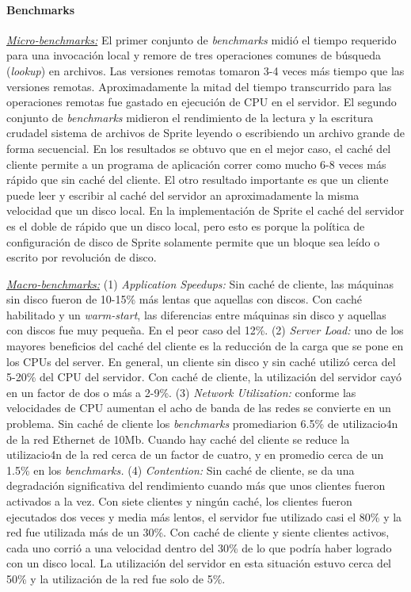 \paragraph{\textnormal{\textbf{Benchmarks}}}
\underline{\emph{Micro-benchmarks:}} El primer conjunto de \emph{benchmarks} midió el tiempo requerido para una invocación local y remore de tres operaciones comunes de búsqueda (\emph{lookup}) en archivos. Las versiones remotas tomaron 3-4 veces más tiempo que las versiones remotas. Aproximadamente la mitad del tiempo transcurrido para las operaciones remotas fue gastado en ejecución de CPU en el servidor. El segundo conjunto de \emph{benchmarks} midieron el rendimiento de la lectura y la escritura crudadel sistema de archivos de Sprite leyendo o escribiendo un archivo grande de forma secuencial. En los resultados se obtuvo que en el mejor caso, el caché del cliente permite a un programa de aplicación correr como mucho 6-8 veces más rápido que sin caché del cliente. El otro resultado importante es que un cliente puede leer y escribir al caché del servidor an aproximadamente la misma velocidad que un disco local. En la implementación de Sprite el caché del servidor es el doble de rápido que un disco local, pero esto es porque la política de configuración de disco de Sprite solamente permite que un bloque sea leído o escrito por revolución de disco. 

\underline{\emph{Macro-benchmarks:}} (1) \emph{Application Speedups:} Sin caché de cliente, las máquinas sin disco fueron de 10-15\% más lentas que aquellas con discos. Con caché habilitado y un \emph{warm-start}, las diferencias entre máquinas sin disco y aquellas con discos fue muy pequeña. En el peor caso del 12\%. (2) \emph{Server Load:} uno de los mayores beneficios del caché del cliente es la reducción de la carga que se pone en los CPUs del server. En general, un cliente sin disco y sin caché utilizó cerca del 5-20\% del CPU del servidor. Con caché de cliente, la utilización del servidor cayó en un factor de dos o más a 2-9\%. (3) \emph{Network Utilization:} conforme las velocidades de CPU aumentan el acho de banda de las redes se convierte en un problema. Sin caché de cliente los \emph{benchmarks} promediarion 6.5\% de utilizacio4n de la red Ethernet de 10Mb. Cuando hay caché del cliente se reduce la utilizacio4n de la red cerca de un factor de cuatro, y en promedio cerca de un 1.5\% en los \emph{benchmarks.} (4) \emph{Contention:} Sin caché de cliente, se da una degradación significativa del rendimiento cuando más que unos clientes fueron activados a la vez. Con siete clientes y ningún caché, los clientes fueron ejecutados dos veces y media más lentos, el servidor fue utilizado casi el 80\% y la red fue utilizada más de un 30\%. Con caché de cliente y siente clientes activos, cada uno corrió a una velocidad dentro del 30\% de lo que podría haber logrado con un disco local. La utilización del servidor en esta situación estuvo cerca del 50\% y la utilización de la red fue solo de 5\%.

